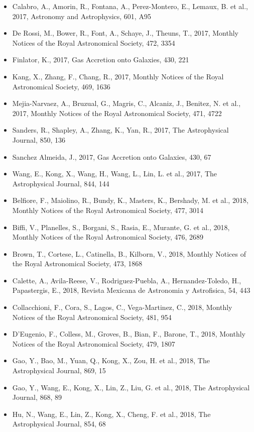 \documentclass{letter}
\begin{document}
\begin{enumerate}
\begin{itemize}
\item Calabro, A., Amorin, R., Fontana, A., Perez-Montero, E., Lemaux, B. et al., 2017, Astronomy and Astrophysics, 601, A95
\item De Rossi, M., Bower, R., Font, A., Schaye, J., Theuns, T., 2017, Monthly Notices of the Royal Astronomical Society, 472, 3354
\item Finlator, K., 2017, Gas Accretion onto Galaxies, 430, 221
\item Kang, X., Zhang, F., Chang, R., 2017, Monthly Notices of the Royal Astronomical Society, 469, 1636
\item Mejia-Narvaez, A., Bruzual, G., Magris, C., Alcaniz, J., Benitez, N. et al., 2017, Monthly Notices of the Royal Astronomical Society, 471, 4722
\item Sanders, R., Shapley, A., Zhang, K., Yan, R., 2017, The Astrophysical Journal, 850, 136
\item Sanchez Almeida, J., 2017, Gas Accretion onto Galaxies, 430, 67
\item Wang, E., Kong, X., Wang, H., Wang, L., Lin, L. et al., 2017, The Astrophysical Journal, 844, 144
\item Belfiore, F., Maiolino, R., Bundy, K., Masters, K., Bershady, M. et al., 2018, Monthly Notices of the Royal Astronomical Society, 477, 3014
\item Biffi, V., Planelles, S., Borgani, S., Rasia, E., Murante, G. et al., 2018, Monthly Notices of the Royal Astronomical Society, 476, 2689
\item Brown, T., Cortese, L., Catinella, B., Kilborn, V., 2018, Monthly Notices of the Royal Astronomical Society, 473, 1868
\item Calette, A., Avila-Reese, V., Rodriguez-Puebla, A., Hernandez-Toledo, H., Papastergis, E., 2018, Revista Mexicana de Astronomia y Astrofisica, 54, 443
\item Collacchioni, F., Cora, S., Lagos, C., Vega-Martinez, C., 2018, Monthly Notices of the Royal Astronomical Society, 481, 954
\item D'Eugenio, F., Colless, M., Groves, B., Bian, F., Barone, T., 2018, Monthly Notices of the Royal Astronomical Society, 479, 1807
\item Gao, Y., Bao, M., Yuan, Q., Kong, X., Zou, H. et al., 2018, The Astrophysical Journal, 869, 15
\item Gao, Y., Wang, E., Kong, X., Lin, Z., Liu, G. et al., 2018, The Astrophysical Journal, 868, 89
\item Hu, N., Wang, E., Lin, Z., Kong, X., Cheng, F. et al., 2018, The Astrophysical Journal, 854, 68

\end{itemize}
\end{enumerate}
\end{document}
